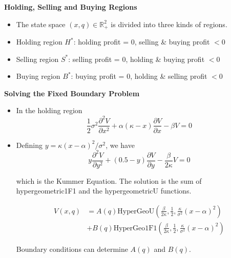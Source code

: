 \documentclass{beamer}
\begin{document}
\begin{frame}
{\bf Holding, Selling and Buying Regions}

\begin{itemize}
  \item The state space $(x,q) \in \mathbb{R}^2_+$ is divided into three kinds of regions.
  \item {\small Holding region $H^*$: holding profit = 0, selling \& buying profit $<0$}
  \item {\small Selling region $S^*$: selling profit = 0, holding \& buying profit $<0$}
  \item {\small Buying region $B^*$: buying profit = 0, holding \& selling profit $<0$}
\end{itemize}

\end{frame}

\begin{frame}
{\bf Solving the Fixed Boundary Problem}
\begin{itemize}
  \item In the holding region
  \begin{equation*}
  \frac{1}{2} \sigma^2 \frac{\partial^2 V}{\partial x^2} + \alpha (\kappa - x) \frac{\partial V}{\partial x} - \beta V = 0
\end{equation*}

\item Defining $y = \kappa (x-\alpha)^2/\sigma^2$, we have
\begin{equation*}
  y \frac{\partial^2 V}{\partial y^2} + (0.5 - y) \frac{\partial V}{\partial y} -\frac{\beta}{2\kappa} V = 0
\end{equation*}

which is the Kummer Equation. The solution is the sum of hypergeometric1F1 and the hypergeometricU functions.

\begin{equation*}
\begin{split}
  V(x,q) &= A(q)\text{HyperGeoU}\left(\frac{\beta}{2\kappa},\frac{1}{2},\frac{\kappa}{\sigma^2}(x-\alpha)^2\right) \\
  &+ B(q)\text{HyperGeo1F1}\left(\frac{\beta}{2\kappa},\frac{1}{2},\frac{\kappa}{\sigma^2}(x-\alpha)^2\right)
  \end{split}
\end{equation*}

Boundary conditions can determine $A(q)$ and $B(q)$.

\end{itemize}

\end{frame}
\end{document}
